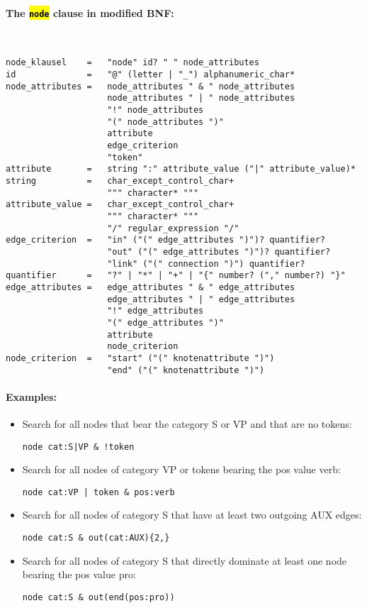 \documentclass[12pt]{scrartcl}
\newcommand{\code}[1]{\hl{\texttt{#1}}}
\begin{document}
\paragraph*{The \code{node} clause in modified BNF:}
~
\begin{lstlisting}
node_klausel    =   "node" id? " " node_attributes
id              =   "@" (letter | "_") alphanumeric_char*
node_attributes =   node_attributes " & " node_attributes
                    node_attributes " | " node_attributes
                    "!" node_attributes
                    "(" node_attributes ")"
                    attribute
                    edge_criterion
                    "token"
attribute       =   string ":" attribute_value ("|" attribute_value)*
string          =   char_except_control_char+
                    """ character* """
attribute_value =   char_except_control_char+
                    """ character* """
                    "/" regular_expression "/"
edge_criterion  =   "in" ("(" edge_attributes ")")? quantifier?
                    "out" ("(" edge_attributes ")")? quantifier?
                    "link" ("(" connection ")") quantifier?
quantifier      =   "?" | "*" | "+" | "{" number? ("," number?) "}"
edge_attributes =   edge_attributes " & " edge_attributes
                    edge_attributes " | " edge_attributes
                    "!" edge_attributes
                    "(" edge_attributes ")"
                    attribute
                    node_criterion
node_criterion  =   "start" ("(" knotenattribute ")")
                    "end" ("(" knotenattribute ")")
\end{lstlisting}


\paragraph*{Examples:}
\begin{itemize}
	\item Search for all nodes that bear the category S or VP and that are no tokens:
	\begin{lstlisting}[gobble=8,aboveskip=.6em,belowskip=.2em]
		node cat:S|VP & !token
	\end{lstlisting}
	\item Search for all nodes of category VP or tokens bearing the pos value verb:
	\begin{lstlisting}[gobble=8,aboveskip=.6em,belowskip=.2em]
		node cat:VP | token & pos:verb
	\end{lstlisting}
	\item Search for all nodes of category S that have at least two outgoing AUX edges:
	\begin{lstlisting}[gobble=8,aboveskip=.6em,belowskip=.2em]
		node cat:S & out(cat:AUX){2,}
	\end{lstlisting}
	\item Search for all nodes of category S that directly dominate at least one node bearing the pos value pro:
	\begin{lstlisting}[gobble=8,aboveskip=.6em,belowskip=.2em]
		node cat:S & out(end(pos:pro))
	\end{lstlisting}
\end{itemize}
\end{document}
